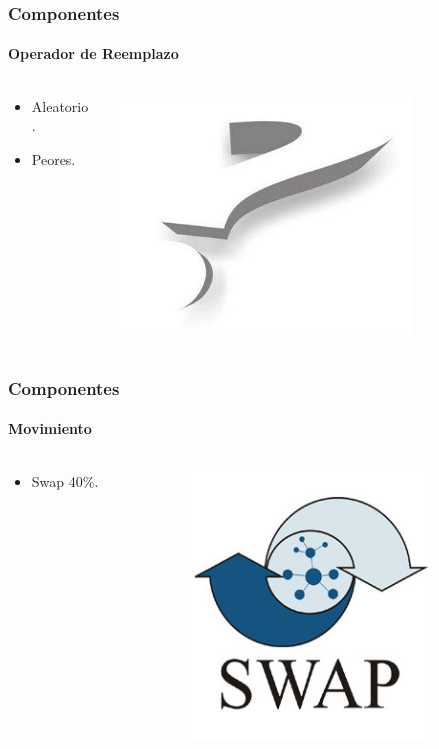 \frame
{
\frametitle{Componentes}
\framesubtitle{Operador de Reemplazo}
\begin{columns}
    \begin{column}{0.5\textwidth}
        \begin{itemize}
            \item Aleatorio.
            \item Peores.
        \end{itemize}
    \end{column}
    \begin{column}{0.5\textwidth}
        \includegraphics[width=0.75\textwidth]{img/pregunta}
    \end{column}
\end{columns}
}


\frame
{
\frametitle{Componentes}
\framesubtitle{Movimiento}
\begin{columns}
    \begin{column}{0.5\textwidth}
        \begin{itemize}
            \item Swap 40\%.
        \end{itemize}
    \end{column}
    \begin{column}{0.5\textwidth}
        \includegraphics[width=0.75\textwidth]{img/swap}
    \end{column}
\end{columns}
}

